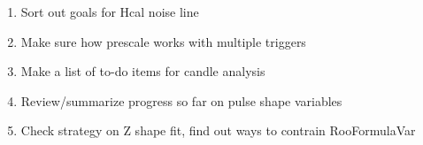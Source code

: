 
\begin{enumerate}
\item Sort out goals for Hcal noise line
\item Make sure how prescale works with multiple triggers
\item Make a list of to-do items for candle analysis
\item Review/summarize progress so far on pulse shape variables
\item Check strategy on Z shape fit, find out ways to contrain RooFormulaVar
\end{enumerate}


